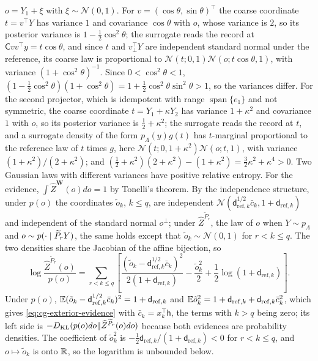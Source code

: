 \(o=Y_1+\xi\) with \(\xi\sim\mathcal N(0,1)\). For
\(v=(\cos\theta,\sin\theta)^\top\) the coarse coordinate \(t=v^\top Y\) has
variance \(1\) and covariance \(\cos\theta\) with \(o\), whose variance is \(2\),
so its posterior variance is \(1-\frac12\cos^2\theta\); the surrogate reads the
record at \(\mathsf Cvv^\top y=t\cos\theta\), and since \(t\) and
\(v_\perp^\top Y\) are independent standard normal under the reference, its coarse
law is proportional to \(\mathcal N(t;0,1)\mathcal N(o;t\cos\theta,1)\), with
variance \((1+\cos^2\theta)^{-1}\). Since \(0<\cos^2\theta<1\),
\((1-\frac12\cos^2\theta)(1+\cos^2\theta)=1+\frac12\cos^2\theta\sin^2\theta>1\), so the
variances differ. For the second projector, which is idempotent with range
\(\operatorname{span}\{e_1\}\) and not symmetric, the coarse coordinate
\(t=Y_1+\kappa Y_2\) has variance \(1+\kappa^2\) and covariance \(1\) with \(o\),
so its posterior variance is \(\frac12+\kappa^2\); the surrogate reads the record
at \(t\), and a surrogate density of the form \(p_\Lambda(y)g(t)\) has
\(t\)-marginal proportional to the reference law of \(t\) times \(g\), here
\(\mathcal N(t;0,1+\kappa^2)\mathcal N(o;t,1)\), with variance
\((1+\kappa^2)/(2+\kappa^2)\); and
\((\frac12+\kappa^2)(2+\kappa^2)-(1+\kappa^2)=\frac32\kappa^2+\kappa^4>0\). Two
Gaussian laws with different variances have positive relative entropy. For the
evidence, \(\int\widehat Z^{\mathbf W}(o)do=1\) by Tonelli's theorem. By the
independence structure, under \(p(o)\) the coordinates \(\tilde o_k\), \(k\leq q\),
are independent \(\mathcal N(\mathsf d_{\mathrm{ref},k}^{1/2}\bar c_k,1+\mathsf d_{\mathrm{ref},k})\)
and independent of the standard normal \(o^\perp\); under
\(\widehat Z^{\widetilde P_r}\), the law of \(o\) when \(Y\sim p_\Lambda\) and
\(o\sim p(\cdot\mid\widetilde P_rY)\), the same holds except that
\(\tilde o_k\sim\mathcal N(0,1)\) for \(r<k\leq q\). The two densities share the
Jacobian of the affine bijection, so
\begin{equation}
\log\frac{\widehat Z^{\widetilde P_r}(o)}{p(o)}
=\sum_{r<k\leq q}\left[\frac{(\tilde o_k-\mathsf d_{\mathrm{ref},k}^{1/2}\bar c_k)^2}{2(1+\mathsf d_{\mathrm{ref},k})}
-\frac{\tilde o_k^2}{2}+\frac12\log\left(1+\mathsf d_{\mathrm{ref},k}\right)\right].
\end{equation}
Under \(p(o)\),
\(\mathbb E(\tilde o_k-\mathsf d_{\mathrm{ref},k}^{1/2}\bar c_k)^2=1+\mathsf d_{\mathrm{ref},k}\)
and \(\mathbb E\tilde o_k^2=1+\mathsf d_{\mathrm{ref},k}+\mathsf d_{\mathrm{ref},k}\bar c_k^2\),
which gives \eqref{eq:cg-exterior-evidence} with \(\bar c_k=x_k^\top\mathsf h\), the
terms with \(k>q\) being zero; its left side is
\(-D_{\mathrm{KL}}(p(o)do\Vert\widehat Z^{\widetilde P_r}(o)do)\) because both evidences are
probability densities. The coefficient of
\(\tilde o_k^2\) is \(-\frac12\mathsf d_{\mathrm{ref},k}/(1+\mathsf d_{\mathrm{ref},k})<0\)
for \(r<k\leq q\), and \(o\mapsto\tilde o_k\) is onto \(\mathbb R\), so the logarithm is
unbounded below.

